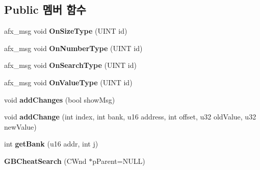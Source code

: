 \subsection*{Public 멤버 함수}
\begin{DoxyCompactItemize}
\item 
\mbox{\label{class_g_b_cheat_search_afd12bb730e61ef2cf06ccd22e89eb487}} 
afx\+\_\+msg void {\bfseries On\+Size\+Type} (U\+I\+NT id)
\item 
\mbox{\label{class_g_b_cheat_search_a2efda7e683705801f7c40be0ae7e59f2}} 
afx\+\_\+msg void {\bfseries On\+Number\+Type} (U\+I\+NT id)
\item 
\mbox{\label{class_g_b_cheat_search_a676c75efb01f9db07ca3d4bc6f499687}} 
afx\+\_\+msg void {\bfseries On\+Search\+Type} (U\+I\+NT id)
\item 
\mbox{\label{class_g_b_cheat_search_a9f187d1fa0dfccbaa4a7a298284a2b8f}} 
afx\+\_\+msg void {\bfseries On\+Value\+Type} (U\+I\+NT id)
\item 
\mbox{\label{class_g_b_cheat_search_a10b0314fc3b27cda2e217539c9c1e052}} 
void {\bfseries add\+Changes} (bool show\+Msg)
\item 
\mbox{\label{class_g_b_cheat_search_a1765135b0200e93b3d8fd13c8c9c2ea0}} 
void {\bfseries add\+Change} (int index, int bank, u16 address, int offset, u32 old\+Value, u32 new\+Value)
\item 
\mbox{\label{class_g_b_cheat_search_aa5ca7951ce9dcc691eff7abb51cde184}} 
int {\bfseries get\+Bank} (u16 addr, int j)
\item 
\mbox{\label{class_g_b_cheat_search_ad5e4e36c0e6c0155db2b2e1887419d3e}} 
{\bfseries G\+B\+Cheat\+Search} (C\+Wnd $\ast$p\+Parent=N\+U\+LL)
\end{DoxyCompactItemize}
